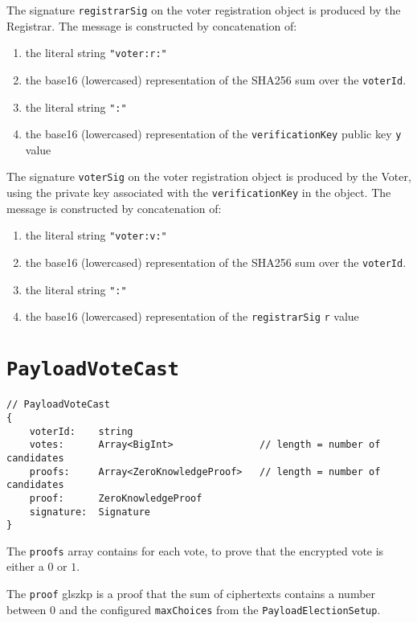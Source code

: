 The signature \texttt{registrarSig} on the voter registration object is produced by the Registrar. The message is constructed by concatenation of:

\begin{enumerate}
  \item the literal string \lstinline[style=ES6]{"voter:r:"}
  \item the base16 (lowercased) representation of the SHA256 sum over the \texttt{voterId}.
  \item the literal string \lstinline[style=ES6]{":"}
  \item the base16 (lowercased) representation of the \texttt{verificationKey} public key \texttt{y} value
\end{enumerate}

The signature \texttt{voterSig} on the voter registration object is produced by the Voter, using the private key associated with the \texttt{verificationKey} in the object. The message is constructed by concatenation of:

\begin{enumerate}
  \item the literal string \lstinline[style=ES6]{"voter:v:"}
  \item the base16 (lowercased) representation of the SHA256 sum over the \texttt{voterId}.
  \item the literal string \lstinline[style=ES6]{":"}
  \item the base16 (lowercased) representation of the \texttt{registrarSig} \texttt{r} value
\end{enumerate}

\section*{\texttt{PayloadVoteCast}}
\label{dt:payload:cast}
\begin{lstlisting}[style=ES6]
// PayloadVoteCast
{
    voterId:    string
    votes:      Array<BigInt>               // length = number of candidates
    proofs:     Array<ZeroKnowledgeProof>   // length = number of candidates
    proof:      ZeroKnowledgeProof
    signature:  Signature
}
\end{lstlisting}

The \texttt{proofs} array contains  for each vote, to prove that the encrypted vote is either a $0$ or $1$.

The \texttt{proof} gls{zkp} is a proof that the sum of ciphertexts contains a number between $0$ and the configured \texttt{maxChoices} from the \texttt{PayloadElectionSetup}.

